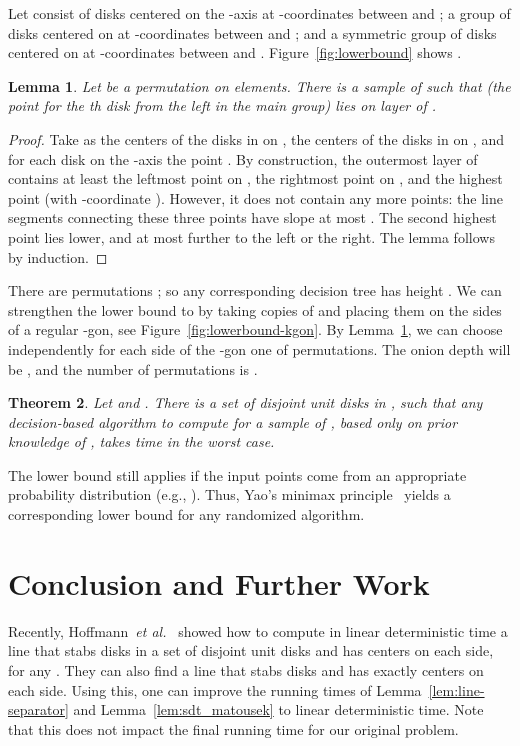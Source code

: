 \documentclass{paper}
\newcommand {\etal} {\textit {et al.}}
\newtheorem{theorem}{Theorem}[section]
\newtheorem{lemma}[theorem]{Lemma}
\begin{document}
Let  consist 
of  disks centered on the -axis at -coordinates 
between  and ;
a group of  disks centered on  at -coordinates 
between  and ;
and a symmetric group of  disks centered on 
 at -coordinates between  and .
Figure~\ref {fig:lowerbound} shows .

\begin{lemma}\label{lem:permute}
Let  be a permutation on  elements. There is a sample  
of  such that  (the point for the th disk from the left in 
the main group) lies 
on layer  of .
\end{lemma}
\begin{proof}
Take  as the  centers of the disks in  on ,
the  centers of the disks in  on , and for each 
disk  on the -axis
the point .
By construction, the outermost layer of  contains at 
least the leftmost point on , the rightmost point on 
, and the highest point (with -coordinate ).
However, it does not contain any more points: the line segments connecting 
these three points have slope at most . The second highest point 
lies  lower, and at most  further to the left or the right.
The lemma follows by induction. 
\end{proof}

There are  permutations ;
so any corresponding decision tree has height
.
We can strengthen the lower bound to 
 by taking  copies of 
and placing them on the sides of a regular 
-gon, see Figure~\ref{fig:lowerbound-kgon}. 
By Lemma~\ref{lem:permute}, we can choose independently for
each side of the -gon one of  permutations.
The onion depth will be , and the number of permutations
is . 


\begin{theorem}\label{thm:lowerb}
  Let  and . There is a set
   of  disjoint unit disks in ,
  such that any decision-based algorithm to compute  for a sample
   of ,
  based only on prior knowledge of ,
  takes  time in the worst case.
\end{theorem}

The lower bound still applies if
the input points come from an appropriate probability distribution (e.g.,
\cite[Claim~2.2]{Ailon11}). Thus, Yao's minimax 
principle~\cite[Chapter~2.2]{MotwaniRa95} 
yields a corresponding lower bound for any randomized algorithm.

\section{Conclusion and Further Work}

Recently, Hoffmann~\etal~\cite{hkm13} showed how to compute 
in linear deterministic time a line that stabs 
 disks in a set of  disjoint unit 
disks and has  centers on each side, for any 
. They can also find a line that stabs  
disks and has exactly  centers on each side. 
Using this, one can improve the running times of 
Lemma~\ref{lem:line-separator} and Lemma~\ref{lem:sdt_matousek} 
to linear deterministic time. Note that this does not 
impact the final running time for our original problem.
\end{document}

